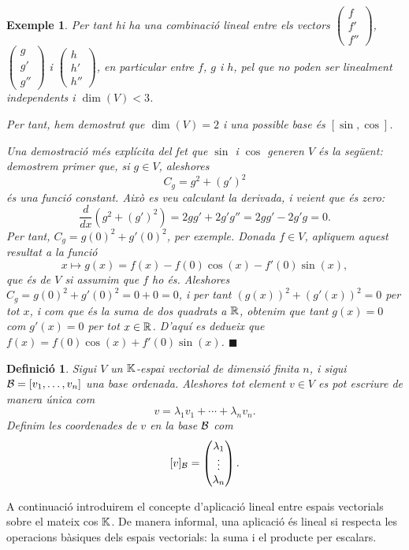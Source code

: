 \documentclass[
  11pt,
]{book}
\numberwithin{dummy}{section}
\theoremstyle{maincolornumbox}
\theoremstyle{blacknumex}
\newtheorem{exampleT}{Exemple}[chapter]
\theoremstyle{blacknumbox}
\newtheorem{definitionT}{Definició}[chapter]
\theoremstyle{maincolornum}
\newenvironment{definition}{\begin{dBox}\begin{definitionT}}{\end{definitionT}\end{dBox}}
\newenvironment{example}{\begin{exampleT}}{\hfill{\tiny\ensuremath{\blacksquare}}\end{exampleT}}
\newlength\esp
\begin{document}
\begin{example}
Per tant hi ha una combinació lineal entre els vectors
\(\left(\begin{smallmatrix}f\\f'\\f''\end{smallmatrix}\right)\),
\(\left(\begin{smallmatrix}g\\g'\\g''\end{smallmatrix}\right)\) i
\(\left(\begin{smallmatrix}h\\h'\\h''\end{smallmatrix}\right)\), en
particular entre \(f\), \(g\) i \(h\), pel que no poden ser linealment
independents i \(\dim(V)<3\).

Per tant, hem demostrat que \(\dim(V)=2\) i una possible base és
\([\sin,\cos]\).

Una demostració més explícita del fet que \(\sin\) i \(\cos\) generen \(V\) és
la següent: demostrem primer que, si \(g\in V\), aleshores
\[C_g = g^2 + (g')^2\] és una funció constant. Això es veu calculant la
derivada, i veient que és zero:
\[\frac{d}{dx} (g^2+(g')^2) = 2gg' + 2g'g'' = 2gg'-2g'g = 0.\] Per tant,
\(C_g = g(0)^2 + g'(0)^2\), per exemple. Donada \(f\in V\), apliquem aquest
resultat a la funció
\[x\mapsto g(x) = f(x)-f(0)\cos(x) - f'(0)\sin(x),\] que és de \(V\) si
assumim que \(f\) ho és. Aleshores \(C_g = g(0)^2 + g'(0)^2 = 0 + 0 = 0\), i
per tant \((g(x))^2+(g'(x))^2=0\) per tot \(x\), i com que és la suma de dos
quadrats a \(\mathbb{R}\), obtenim que tant \(g(x)=0\) com \(g'(x)=0\) per tot
\(x\in\mathbb{R}\). D'aquí es dedueix que \(f(x) = f(0)\cos(x) + f'(0)\sin(x)\).
\end{example}

\begin{definition}
Sigui \(V\) un \(\mathbb{K}\)-espai vectorial de dimensió finita \(n\), i sigui
\(\mathcal{B} = [v_1,\ldots ,v_n]\) una base ordenada. Aleshores tot element
\(v\in V\) es pot escriure de manera única com
\[v= \lambda_1v_1+\cdots +\lambda_n v_n.\] Definim les \emph{coordenades de
\(v\) en la base \(\mathcal{B}\)} com
\[[v]_{\mathcal{B}} = \begin{pmatrix}\lambda_1\\\vdots\\\lambda_n\end{pmatrix}.\]
\end{definition}

A continuació introduirem el concepte d'aplicació lineal entre espais
vectorials sobre el mateix cos \(\mathbb{K}\). De manera informal, una aplicació
és lineal si respecta les operacions bàsiques dels espais vectorials: la
suma i el producte per escalars.
\end{document}
